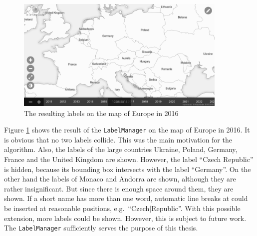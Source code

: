 \begin{figure}[ht]
  \vspace{1em}
  \centering
  \includegraphics[width=0.9\textwidth]{graphics/development/implementation/label_manager.png}
  \caption{The resulting labels on the map of Europe in 2016}
  \label{fig:label_manager}
\end{figure}

Figure \ref{fig:label_manager} shows the result of the \texttt{LabelManager} on the map of Europe in 2016. It is obvious that no two labels collide. This was the main motivation for the algorithm. Also, the labels of the large countries Ukraine, Poland, Germany, France and the United Kingdom are shown. However, the label ``Czech Republic'' is hidden, because its bounding box intersects with the label ``Germany''. On the other hand the labels of Monaco and Andorra are shown, although they are rather insignificant. But since there is enough space around them, they are shown.
If a short name has more than one word, automatic line breaks at could be inserted at reasonable positions, e.g.\ ``Czech$|$Republic''. With this possible extension, more labels could be shown.
However, this is subject to future work.
The \texttt{LabelManager} sufficiently serves the purpose of this thesis.



